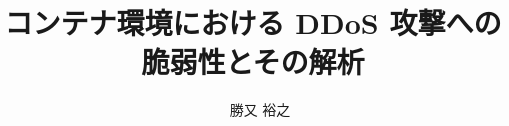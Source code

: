 
\renewcommand{\baselinestretch}{0.5}

\title{コンテナ環境における DDoS 攻撃への脆弱性とその解析}
\author{~~勝又 裕之}

\pagestyle{headings}

\def\figlabel#1{\label{fig:#1}}
\def\tablabel#1{\label{tab:#1}}
\def\chaplabel#1{\label{chap:#1}}
\def\seclabel#1{\label{sec:#1}}
\def\applabel#1{\label{app:#1}}

\def\figref#1{図~\ref{fig:#1}}
\def\tabref#1{表~\ref{tab:#1}}
\def\chapref#1{第~\ref{chap:#1}章}
\def\secref#1{第~\ref{sec:#1}節}
\def\appref#1{付録~\ref{app:#1}}

\def\labelenumi{(\theenumi)}

\jabst{} %



\maketitle
\makejabstract


